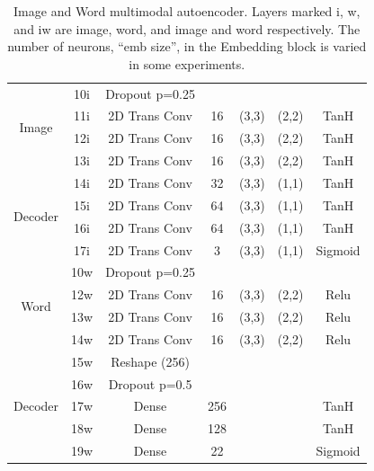 \begin{table}
\begin{tabular}{|c|c|c|c|c|c|c|}
			
			\multirow{4}{*}{Image} & 10i 	&	Dropout p=0.25 &	 & 	     &       & \\ \cline{2-7}
			& 11i	&	2D Trans Conv & 16 & (3,3) & (2,2)  & TanH \\ \cline{2-7}
			& 12i	&	2D Trans Conv & 16 & (3,3) & (2,2)  & TanH \\ \cline{2-7}
			& 13i	&	2D Trans Conv & 16 & (3,3) & (2,2)  & TanH \\ \cline{2-7}
\multirow{4}{*}{Decoder}& 14i	&	2D Trans Conv & 32 & (3,3) & (1,1)  & TanH \\ \cline{2-7}
			& 15i	&	2D Trans Conv & 64 & (3,3) & (1,1)  & TanH \\ \cline{2-7}
			& 16i	&	2D Trans Conv & 64 & (3,3) & (1,1)  & TanH \\ \cline{2-7}
			& 17i	&	2D Trans Conv & 3 & (3,3) & (1,1) & Sigmoid\\ \hline 

			\multirow{4}{*}{Word} & 10w 	&	Dropout p=0.25 &	 & 	     &       & \\ \cline{2-7}
			& 12w	&	2D Trans Conv & 16 & (3,3) & (2,2)  & Relu \\ \cline{2-7}
			& 13w	&	2D Trans Conv & 16 & (3,3) & (2,2)  & Relu \\ \cline{2-7}
			& 14w	&	2D Trans Conv & 16 & (3,3) & (2,2)  & Relu \\ \cline{2-7}
\multirow{5}{*}{Decoder}& 15w	& Reshape (256) & & & & \\ \cline{2-7}
			& 16w	& Dropout p=0.5 &	 & 	     &       & \\ \cline{2-7}
			& 17w	& Dense & 256 & & &TanH \\ \cline{2-7}
			& 18w	& Dense & 128 & & &TanH \\ \cline{2-7}
			& 19w	& Dense & 22 & & & Sigmoid \\ \hline
			
			
		\end{tabular}
		\caption{Image and Word multimodal autoencoder. Layers marked i, w, and iw are image, word, and image and word respectively. The number of neurons, ``emb size'', in the Embedding block is varied in some experiments.}
		\label{tab:Arts_MAE_description}

	\end{table}
